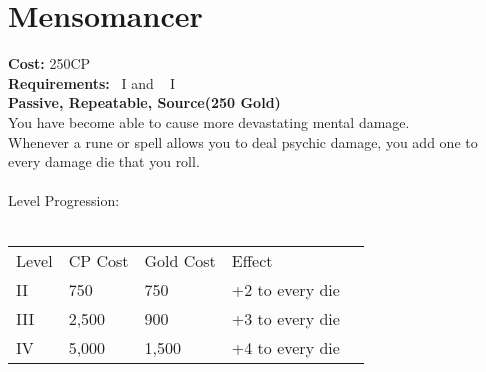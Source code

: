 \section{Mensomancer}\label{perk:mensomancer}
\textbf{Cost:} 250CP\\
\textbf{Requirements:}~ I and ~ I\\
\textbf{Passive, Repeatable, Source(250 Gold)}\\
You have become able to cause more devastating mental damage.\\
Whenever a rune or spell allows you to deal psychic damage, you add one to every damage die that you roll.\\
\\
Level Progression:\\
\\
\begin{tabular}{l | l | l | l | l}
    Level & CP Cost & Gold Cost &  Effect\\
    II & 750 & 750 & +2 to every die\\
    III & 2,500 & 900 & +3 to every die\\
    IV & 5,000 & 1,500 & +4 to every die\\
\end{tabular}